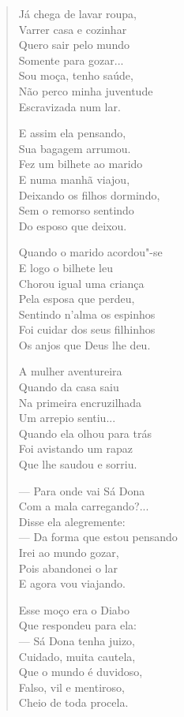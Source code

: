 \begin{verse}
Já chega de lavar roupa, \\
Varrer casa e cozinhar \\
Quero sair pelo mundo \\
Somente para gozar... \\
Sou moça, tenho saúde, \\
Não perco minha juventude \\
Escravizada num lar. 
\pagebreak

E assim ela pensando, \\
Sua bagagem arrumou. \\
Fez um bilhete ao marido \\
E numa manhã viajou,\\
Deixando os filhos dormindo, \\
Sem o remorso sentindo \\
Do esposo que deixou. 

Quando o marido acordou"-se \\
E logo o bilhete leu \\
Chorou igual uma criança \\
Pela esposa que perdeu, \\
Sentindo n'alma os espinhos \\
Foi cuidar dos seus filhinhos \\
Os anjos que Deus lhe deu. 

A mulher aventureira \\
Quando da casa saiu \\
Na primeira encruzilhada \\
Um arrepio sentiu... \\
Quando ela olhou para trás \\
Foi avistando um rapaz \\
Que lhe saudou e sorriu. 

---  Para onde vai Sá Dona \\
Com a mala carregando?... \\
Disse ela alegremente: \\
---  Da forma que estou pensando \\
Irei ao mundo gozar, \\
Pois abandonei o lar \\
E agora vou viajando. 
\pagebreak

Esse moço era o Diabo \\
Que respondeu para ela:\\
---  Sá Dona tenha juizo, \\
Cuidado, muita cautela, \\
Que o mundo é duvidoso, \\
Falso, vil e mentiroso, \\
Cheio de toda procela. 


\end{verse}
